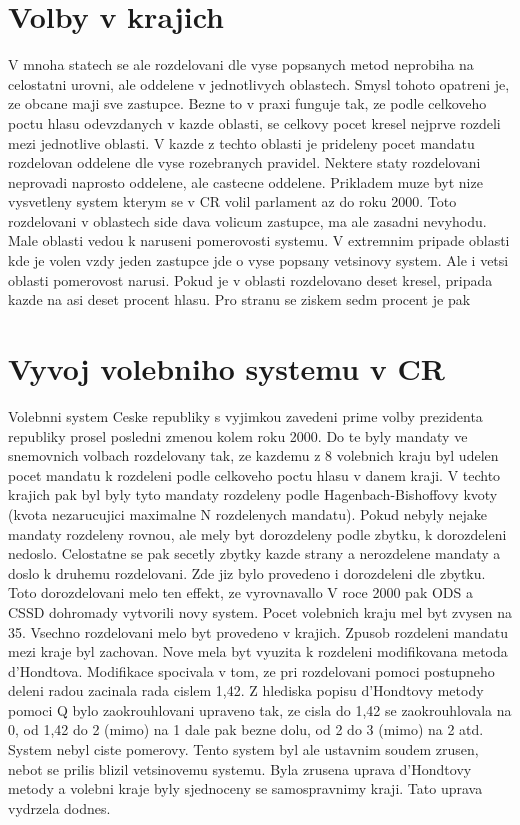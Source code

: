 \documentclass[12pt,a4paper]{article}
\begin{document}
\section{Volby v krajich}
V mnoha statech se ale rozdelovani dle vyse popsanych metod neprobiha na celostatni urovni, ale oddelene v jednotlivych oblastech.
Smysl tohoto opatreni je, ze obcane maji sve  zastupce.
Bezne to v praxi funguje tak, ze podle celkoveho poctu hlasu odevzdanych v kazde oblasti, se celkovy pocet kresel nejprve rozdeli mezi jednotlive oblasti.
V kazde z techto oblasti je prideleny pocet mandatu rozdelovan oddelene dle vyse rozebranych pravidel.
Nektere staty rozdelovani neprovadi naprosto oddelene, ale castecne oddelene.
Prikladem muze byt nize vysvetleny system kterym se v CR volil parlament az do roku 2000. %
Toto rozdelovani v oblastech side dava volicum  zastupce, ma ale zasadni nevyhodu.
Male oblasti vedou k naruseni pomerovosti systemu.
V extremnim pripade oblasti kde je volen vzdy jeden zastupce jde o vyse popsany vetsinovy system. 
Ale i vetsi oblasti pomerovost narusi.
Pokud je v oblasti rozdelovano deset kresel, pripada kazde na asi deset procent hlasu.
Pro stranu se ziskem sedm procent je pak

\section{Vyvoj volebniho systemu v CR}
Volebnni system Ceske republiky s vyjimkou zavedeni prime volby prezidenta republiky prosel posledni zmenou kolem roku 2000.
Do te byly mandaty ve snemovnich volbach rozdelovany tak, ze kazdemu z 8 volebnich kraju byl udelen pocet mandatu k rozdeleni podle celkoveho poctu hlasu v danem kraji.
V techto krajich pak byl byly tyto mandaty rozdeleny podle Hagenbach-Bishoffovy kvoty (kvota nezarucujici maximalne N rozdelenych mandatu).
Pokud nebyly nejake mandaty rozdeleny rovnou, ale mely byt dorozdeleny podle zbytku, k dorozdeleni nedoslo.
Celostatne se pak secetly zbytky kazde strany a nerozdelene mandaty a doslo k druhemu rozdelovani.
Zde jiz bylo provedeno i dorozdeleni dle zbytku.
Toto dorozdelovani melo ten effekt, ze vyrovnavallo %
V roce 2000 pak ODS a CSSD dohromady vytvorili novy system.
Pocet volebnich kraju mel byt zvysen na 35.
Vsechno rozdelovani melo byt provedeno v krajich.
Zpusob rozdeleni mandatu mezi kraje byl zachovan.
Nove mela byt vyuzita k rozdeleni modifikovana metoda d'Hondtova.
Modifikace spocivala v tom, ze pri rozdelovani pomoci postupneho deleni radou zacinala rada cislem 1,42.
Z hlediska popisu d'Hondtovy metody pomoci Q bylo zaokrouhlovani upraveno tak, ze cisla do 1,42 se zaokrouhlovala na 0, od 1,42 do 2 (mimo) na 1 dale pak bezne dolu, od 2 do 3 (mimo) na 2 atd.
System nebyl ciste pomerovy.
Tento system byl ale ustavnim soudem zrusen, nebot se prilis blizil vetsinovemu systemu. \autocite{SOU}
Byla zrusena uprava d'Hondtovy metody a volebni kraje byly sjednoceny se samospravnimy kraji.
Tato uprava vydrzela dodnes.
\end{document}
